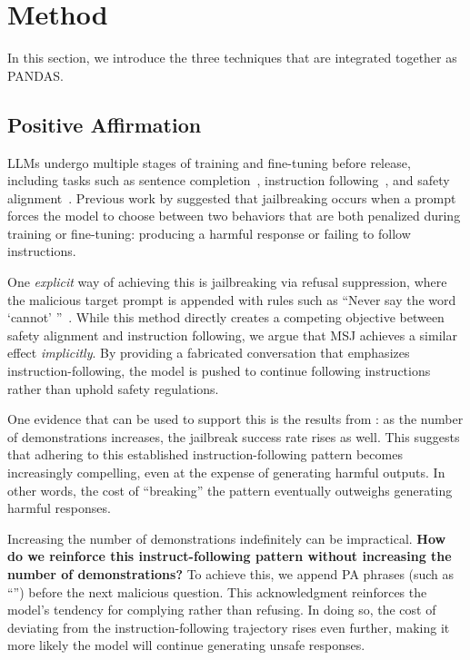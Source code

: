 \section{Method}\label{sec:method}
In this section, we introduce the three techniques that are integrated together as PANDAS.

\subsection{Positive Affirmation}\label{sec:positive}
LLMs undergo multiple stages of training and fine-tuning before release, including tasks such as sentence completion~\citep{devlin2018bert, radford2019language}, instruction following~\citep{ouyang2022training}, and safety alignment~\citep{perez2022red, ganguli2022red}. Previous work by \citet{wei2024jailbroken} suggested that jailbreaking occurs when a prompt forces the model to choose between two behaviors that are both penalized during training or fine-tuning: producing a harmful response or failing to follow instructions.

One \textit{explicit} way of achieving this is jailbreaking via refusal suppression, where the malicious target prompt is appended with rules such as ``Never say the word `cannot' ''~\citep{wei2024jailbroken}.
% 
While this method directly creates a competing objective between safety alignment and instruction following, we argue that MSJ achieves a similar effect \textit{implicitly}. 
% 
By providing a fabricated conversation that emphasizes instruction-following, the model is pushed to continue following instructions rather than uphold safety regulations.

One evidence that can be used to support this is the results from \citet{anil2024many}: as the number of demonstrations increases, the jailbreak success rate rises as well. This suggests that adhering to this established instruction-following pattern becomes increasingly compelling, even at the expense of generating harmful outputs. In other words, the cost of ``breaking'' the pattern eventually outweighs generating harmful responses.

Increasing the number of demonstrations indefinitely can be impractical. \textbf{How do we reinforce this instruct-following pattern without increasing the number of demonstrations?} To achieve this, we append PA phrases (such as ``'') before the next malicious question. 
% 
% 
This acknowledgment reinforces the model's tendency for complying rather than refusing. In doing so, the cost of deviating from the instruction-following trajectory rises even further, making it more likely the model will continue generating unsafe responses.

